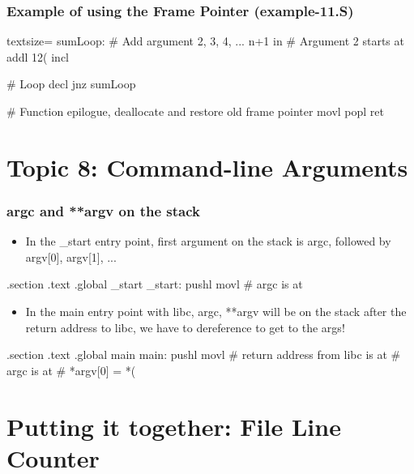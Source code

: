 \documentclass[11pt,xcolor=dvipsnames]{beamer}
\newcommand{\mvs}{\vspace{-0.95em}}
\begin{document}
\begin{frame}[fragile,t]
\frametitle{Example of using the Frame Pointer (example-11.S)}
\mvs
\begin{gascode*}{textsize=}
    sumLoop:
      # Add argument 2, 3, 4, ... n+1 in %
      # Argument 2 starts at %
      addl 12(%
      incl %

      # Loop
      decl %
      jnz sumLoop

    # Function epilogue, deallocate and restore old frame pointer
    movl %
    popl %
    ret
\end{gascode*}
\end{frame}

\section{Topic 8: Command-line Arguments}

\begin{frame}[fragile,t]
\frametitle{argc and **argv on the stack}
\mvs
\begin{itemize}
  \item In the {\ttfamily \_start} entry point, first argument on the stack is {\ttfamily argc}, followed by {\ttfamily argv[0], argv[1], ...}
\end{itemize}
\begin{gascode}
.section .text
.global _start
_start:
  pushl %
  movl %
  # argc is at %
\end{gascode}
\begin{itemize}
  \item In the {\ttfamily main} entry point with libc, {\ttfamily argc, **argv} will be on the stack after the return address to libc, we have to dereference to get to the args!
\end{itemize}
\begin{gascode}
.section .text
.global main
main:
  pushl %
  movl %
  # return address from libc is at %
  # argc is at %
  # *argv[0] = *(%
\end{gascode}
\end{frame}

\section{Putting it together: File Line Counter}
\end{document}
